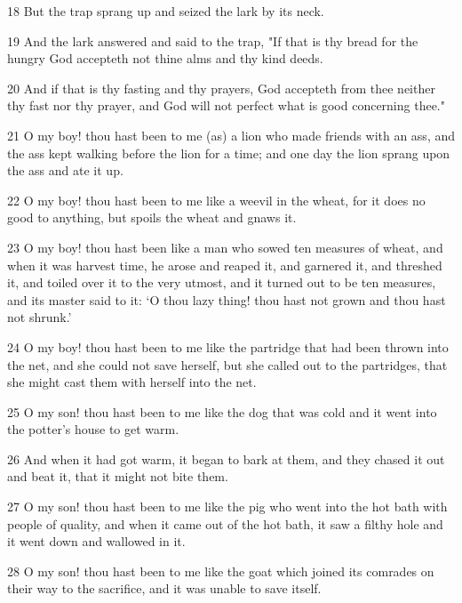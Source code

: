 \par 18 But the trap sprang up and seized the lark by its neck.

\par 19 And the lark answered and said to the trap, "If that is thy bread for the hungry God accepteth not thine alms and thy kind deeds.

\par 20 And if that is thy fasting and thy prayers, God accepteth from thee neither thy fast nor thy prayer, and God will not perfect what is good concerning thee."

\par 21 O my boy! thou hast been to me (as) a lion who made friends with an ass, and the ass kept walking before the lion for a time; and one day the lion sprang upon the ass and ate it up.

\par 22 O my boy! thou hast been to me like a weevil in the wheat, for it does no good to anything, but spoils the wheat and gnaws it.

\par 23 O my boy! thou hast been like a man who sowed ten measures of wheat, and when it was harvest time, he arose and reaped it, and garnered it, and threshed it, and toiled over it to the very utmost, and it turned out to be ten measures, and its master said to it: ‘O thou lazy thing! thou hast not grown and thou hast not shrunk.’

\par 24 O my boy! thou hast been to me like the partridge that had been thrown into the net, and she could not save herself, but she called out to the partridges, that she might cast them with herself into the net.

\par 25 O my son! thou hast been to me like the dog that was cold and it went into the potter's house to get warm.

\par 26 And when it had got warm, it began to bark at them, and they chased it out and beat it, that it might not bite them.

\par 27 O my son! thou hast been to me like the pig who went into the hot bath with people of quality, and when it came out of the hot bath, it saw a filthy hole and it went down and wallowed in it.

\par 28 O my son! thou hast been to me like the goat which joined its comrades on their way to the sacrifice, and it was unable to save itself.

